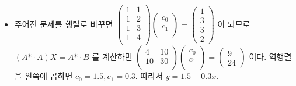 \documentclass[12pt]{report}
\newcommand{\numl}[1]{\item[\large\textbf{#1}]}
\newcommand{\aster}{\text{*}}
\begin{document}
\begin{itemize}
\numl{10.7.5} 주어진 문제를 행렬로 바꾸면
$
	\left(\begin{array}{cc}
		1 & 1 \\
		1 & 2 \\
		1 & 3 \\
		1 & 4 \\
	\end{array}\right) 
	\left(\begin{array}{c}
		c_0 \\
		c_1 \\
	\end{array}\right) = 
		\left(\begin{array}{c}
		1 \\ 3 \\ 3 \\ 2
	\end{array}\right) 
$ 이 되므로 $(A\aster \cdot A) X = A\aster \cdot B$ 를 계산하면 $
	\left(\begin{array}{cc}
		4 & 10 \\
		10 & 30 \\
	\end{array}\right) 
	\left(\begin{array}{c}
		c_0 \\
		c_1 \\
	\end{array}\right) = 
		\left(\begin{array}{c}
		9 \\ 24
	\end{array}\right) 
$ 이다. 역행렬을 왼쪽에 곱하면 $c_0 = 1.5, c_1 = 0.3$. 따라서 $y = 1.5 + 0.3x$.










      
\end{itemize}
\end{document}
